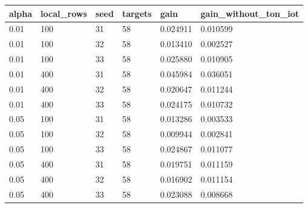 \begin{tabular}{llllll}
\toprule
alpha & local\_rows & seed & targets & gain & gain\_without\_ton\_iot \\
\midrule
0.01 & 100 & 31 & 58 & 0.024911 & 0.010599 \\
0.01 & 100 & 32 & 58 & 0.013410 & 0.002527 \\
0.01 & 100 & 33 & 58 & 0.025880 & 0.010905 \\
0.01 & 400 & 31 & 58 & 0.045984 & 0.036051 \\
0.01 & 400 & 32 & 58 & 0.020647 & 0.011244 \\
0.01 & 400 & 33 & 58 & 0.024175 & 0.010732 \\
0.05 & 100 & 31 & 58 & 0.013286 & 0.003533 \\
0.05 & 100 & 32 & 58 & 0.009944 & 0.002841 \\
0.05 & 100 & 33 & 58 & 0.024867 & 0.011077 \\
0.05 & 400 & 31 & 58 & 0.019751 & 0.011159 \\
0.05 & 400 & 32 & 58 & 0.016902 & 0.011154 \\
0.05 & 400 & 33 & 58 & 0.023088 & 0.008668 \\
\bottomrule
\end{tabular}
